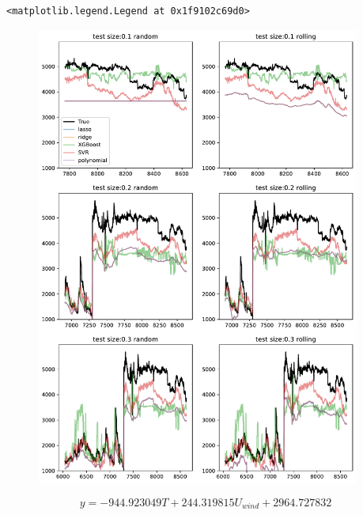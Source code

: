 \begin{verbatim}
<matplotlib.legend.Legend at 0x1f9102c69d0>
\end{verbatim}
\begin{figure}[H]
\begin{center}\includegraphics[width = 0.95\textwidth]{figures/output_44_1.pdf}\end{center}
\vspace{-0.7cm}
\caption{}
\label{fig:}
\end{figure}
\begin{equation}
y = - 944.923049 T + 244.319815 U_{wind} + 2964.727832
\label{eq:model_polynomial}
\end{equation}
